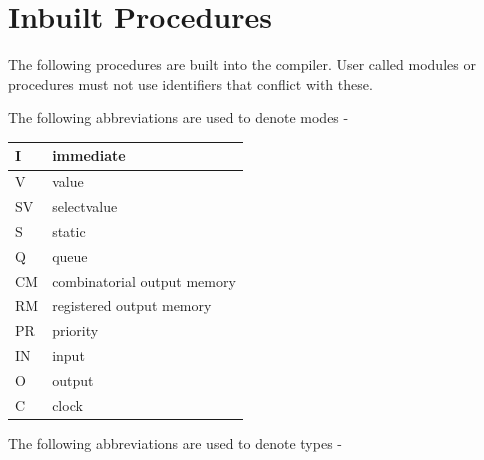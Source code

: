 \pagebreak

\chapter{Inbuilt Procedures}

    The following procedures are built into the compiler. User
    called modules or procedures must not use identifiers that conflict
    with these.
    
    The following abbreviations are used to denote modes -

    \begin{tabular}{| l | l |}
    \hline
    I  & immediate                      \\ \hline
    V  & value                          \\ \hline
    SV & selectvalue                    \\ \hline
    S  & static                         \\ \hline
    Q  & queue                          \\ \hline
    CM & combinatorial output memory    \\ \hline
    RM & registered output memory       \\ \hline
    PR & priority                       \\ \hline
    IN & input                          \\ \hline
    O  & output                         \\ \hline
    C  & clock                          \\ \hline
    \end{tabular}
    
    The following abbreviations are used to denote types -

